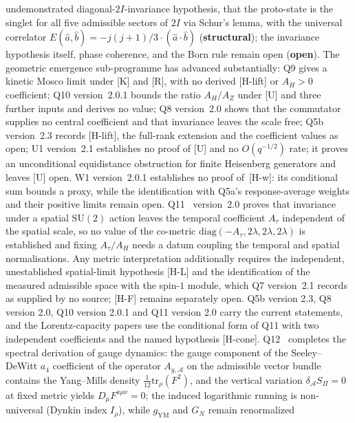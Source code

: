 \documentclass[11pt,a4paper]{article}
\newcommand{\SU}{\mathrm{SU}}
\newcommand{\sstruct}{\textcolor{cstruct}{\textbf{structural}}}
\newcommand{\sopen}{\textcolor{copen}{\textbf{open}}}
\begin{document}
  undemonstrated diagonal-$2I$-invariance hypothesis, that the proto-state is the singlet for all
  five admissible sectors of $2I$ via Schur's lemma, with the universal correlator
  $E(\hat{a},\hat{b}) = -j(j+1)/3\cdot(\hat{a}\cdot\hat{b})$ (\sstruct); the invariance hypothesis
  itself, phase coherence, and the Born rule remain open (\sopen).
  The geometric emergence sub-programme has advanced substantially: Q9 gives a kinetic Mosco
  limit under [K] and [R], with no derived [H-lift] or $A_H>0$ coefficient;
  Q10 version~2.0.1 bounds the ratio $A_H/A_Z$ under [U] and three further inputs and derives no value;
  Q8 version~2.0 shows that the commutator supplies no central coefficient and that invariance leaves the
  scale free; Q5b version~2.3 records [H-lift], the full-rank extension and the coefficient values as open;
  U1 version~2.1 establishes no proof of [U] and no $O(q^{-1/2})$ rate; it proves an
  unconditional equidistance obstruction for finite Heisenberg generators and leaves
  [U] open. W1 version~2.0.1 establishes no proof of~[H-w]: its
  conditional sum bounds a proxy, while the identification with Q5a's
  response-average weights and their positive limits remain open.
  Q11~\cite{Beau2026q11} version~2.0 proves that invariance under a spatial $\SU(2)$ action leaves the temporal
  coefficient $A_\tau$ independent of the spatial scale, so no value of the co-metric
  $\mathrm{diag}(-A_\tau, 2\lambda, 2\lambda, 2\lambda)$ is established and fixing $A_\tau/A_H$ needs a datum coupling
  the temporal and spatial normalisations.
  Any metric interpretation additionally requires the
  independent, unestablished spatial-limit hypothesis [H-L] and the identification of the
  measured admissible space with the spin-$1$ module, which Q7 version~2.1 records as supplied by no
  source; [H-F] remains separately open.
  Q5b version 2.3, Q8 version 2.0, Q10 version 2.0.1 and Q11 version 2.0 carry the current statements, and the
  Lorentz-capacity papers use the conditional form of Q11 with two independent coefficients and the named
  hypothesis [H-cone].
  Q12~\cite{Beau2026q12} completes the spectral derivation of gauge dynamics:
  the gauge component of the Seeley--DeWitt $a_4$ coefficient of the operator
  $A_{g,\mathcal{A}}$ on the admissible vector bundle contains the Yang--Mills density
  $\tfrac{1}{12}\mathrm{tr}_\rho(F^2)$, and the vertical variation $\delta_\mathcal{A}S_\Pi = 0$
  at fixed metric yields $D_\mu F^{a\mu\nu} = 0$; the induced logarithmic running is
  non-universal (Dynkin index $I_\rho$), while $g_{\mathrm{YM}}$ and $G_N$ remain renormalized
\end{document}

